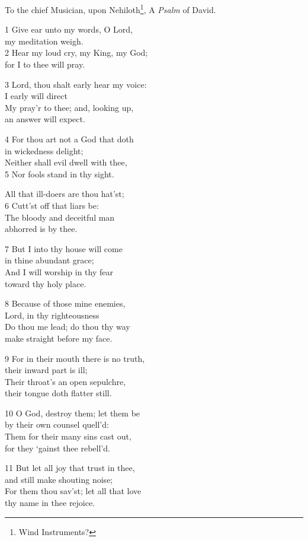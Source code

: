 To the chief Musician, upon Nehiloth\footnote{Wind Instruments?},
A \emph{Psalm} of David.

1 Give ear unto my words, O Lord,\\
my meditation weigh.\\
2 Hear my loud cry, my King, my God;\\
for I to thee will pray.

3 Lord, thou shalt early hear my voice:\\
I early will direct\\
My pray’r to thee; and, looking up,\\
an answer will expect.

4 For thou art not a God that doth\\
in wickedness delight;\\
Neither shall evil dwell with thee,\\
5 Nor fools stand in thy sight.

All that ill-doers are thou hat’st;\\
6 Cutt’st off that liars be:\\
The bloody and deceitful man\\
abhorred is by thee.

7 But I into thy house will come\\
in thine abundant grace;\\
And I will worship in thy fear\\
toward thy holy place.

8 Because of those mine enemies,\\
Lord, in thy righteousness\\
Do thou me lead; do thou thy way\\
make straight before my face.

9 For in their mouth there is no truth,\\
their inward part is ill;\\
Their throat’s an open sepulchre,\\
their tongue doth flatter still.

10 O God, destroy them; let them be\\
by their own counsel quell’d:\\
Them for their many sins cast out,\\
for they ‘gainst thee rebell’d.

11 But let all joy that trust in thee,\\
and still make shouting noise;\\
For them thou sav’st; let all that love\\
thy name in thee rejoice.

